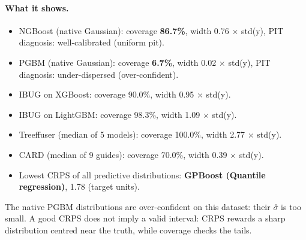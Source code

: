 \documentclass[11pt]{article}
\begin{document}
\paragraph{What it shows.}
\begin{itemize}
\item NGBoost (native Gaussian): coverage \textbf{86.7\%}, width 0.76 $\times$ std(y), PIT diagnosis: well-calibrated (uniform pit).
\item PGBM (native Gaussian): coverage \textbf{6.7\%}, width 0.02 $\times$ std(y), PIT diagnosis: under-dispersed (over-confident).
\item IBUG on XGBoost: coverage 90.0\%, width 0.95 $\times$ std(y).
\item IBUG on LightGBM: coverage 98.3\%, width 1.09 $\times$ std(y).
\item Treeffuser (median of 5 models): coverage 100.0\%, width 2.77 $\times$ std(y).
\item CARD (median of 9 guides): coverage 70.0\%, width 0.39 $\times$ std(y).
\item Lowest CRPS of all predictive distributions: \textbf{GPBoost (Quantile regression)}, 1.78 (target units).
\end{itemize}
\begin{insight}[Takeaway RQ3]
The native PGBM distributions are over-confident on this dataset: their $\sigma$̂ is too small. A good CRPS does not imply a valid interval: CRPS rewards a sharp distribution centred near the truth, while coverage checks the tails.
\end{insight}
\end{document}
